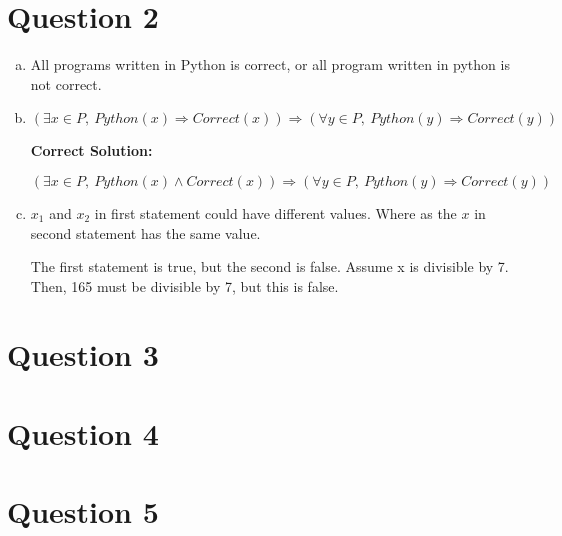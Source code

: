 \documentclass[12pt]{article}
\begin{document}
\section*{Question 2}
\begin{enumerate}[a.]
    \item

    All programs written in Python is correct, or all program written in python
    is not correct.

    \item

    $(\exists x \in P,\:Python(x) \Rightarrow Correct(x)) \Rightarrow (\forall y
    \in P,\:Python(y) \Rightarrow Correct(y))$

    \bigskip

    \textbf{Correct Solution:}

    $(\exists x \in P,\:Python(x) \land Correct(x)) \Rightarrow (\forall y \in P,\:
    Python(y) \Rightarrow Correct(y))$

    \item

    $x_1$ and $x_2$ in first statement could have different values. Where as the $x$ in
    second statement has the same value.

    \bigskip

    The first statement is true, but the second is false. Assume x is divisible by 7.
    Then, 165 must be divisible by 7, but this is false.

\end{enumerate}

\section*{Question 3}

\section*{Question 4}

\section*{Question 5}
\end{document}
